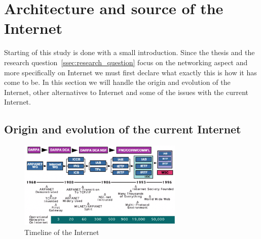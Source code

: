 \section{Architecture and source of the Internet}

Starting of this study is done with a small introduction. Since the thesis and the research question~\ref{ssec:research_question} focus on the networking aspect and more specifically on Internet we must first declare what exactly this is how it has come to be. In this section we will handle the origin and evolution of the Internet, other alternatives to Internet and some of the issues with the current Internet. 

\subsection{Origin and evolution of the current Internet}

\begin{figure}[H]
    \centering
    \includegraphics[width=0.7\textwidth]{figures/Internettimeline}
    \caption{Timeline of the Internet \citep{website:Internethistory}} 
    \label{fig:Internettimeline}
\end{figure}
\npar

